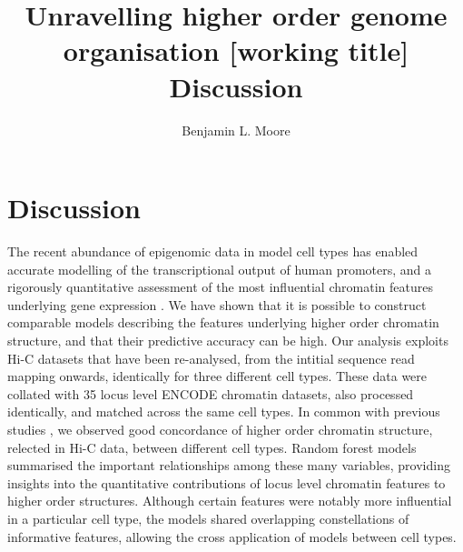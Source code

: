 \documentclass[a4paper,10pt,oneside]{book}
\title{ \vspace{3in} Unravelling higher order genome organisation {\small [working
    title]} \\ \vspace{2em} {\large {\bf Discussion}} }
\author{Benjamin L. Moore}
\begin{document}
\maketitle

\chapter{Discussion}

The recent abundance of epigenomic data in model cell types has
enabled accurate modelling of the transcriptional output of human
promoters, and a rigorously quantitative assessment of the most
influential chromatin features underlying gene expression
\cite{Dong2012}. We have shown that it is possible to construct
comparable models describing the features underlying higher order
chromatin structure, and that their predictive accuracy can be
high. Our analysis exploits Hi-C datasets that have been re-analysed,
from the intitial sequence read mapping onwards, identically for three
different cell types. These data were collated with 35 locus level
ENCODE chromatin datasets, also processed identically, and matched
across the same cell types. In common with previous studies
\cite{Chambers2013, Dixon2012}, we observed good concordance of higher
order chromatin structure, relected in Hi-C data, between different
cell types. Random forest models summarised the important
relationships among these many variables, providing insights into the
quantitative contributions of locus level chromatin features to higher
order structures. Although certain features were notably more
influential in a particular cell type, the models shared overlapping
constellations of informative features, allowing the cross application
of models between cell types.
\end{document}
